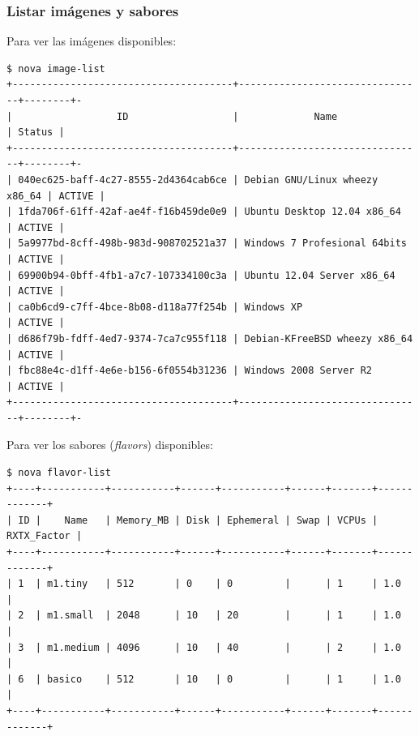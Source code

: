 \documentclass{beamer}
\begin{document}
\begin{frame}[fragile]
  \frametitle{Listar imágenes y sabores}
  Para ver las imágenes disponibles:
\begin{lstlisting}[style=consola]
$ nova image-list
+--------------------------------------+--------------------------------+--------+-
|                  ID                  |             Name               | Status | 
+--------------------------------------+--------------------------------+--------+-
| 040ec625-baff-4c27-8555-2d4364cab6ce | Debian GNU/Linux wheezy x86_64 | ACTIVE | 
| 1fda706f-61ff-42af-ae4f-f16b459de0e9 | Ubuntu Desktop 12.04 x86_64    | ACTIVE | 
| 5a9977bd-8cff-498b-983d-908702521a37 | Windows 7 Profesional 64bits   | ACTIVE | 
| 69900b94-0bff-4fb1-a7c7-107334100c3a | Ubuntu 12.04 Server x86_64     | ACTIVE | 
| ca0b6cd9-c7ff-4bce-8b08-d118a77f254b | Windows XP                     | ACTIVE | 
| d686f79b-fdff-4ed7-9374-7ca7c955f118 | Debian-KFreeBSD wheezy x86_64  | ACTIVE | 
| fbc88e4c-d1ff-4e6e-b156-6f0554b31236 | Windows 2008 Server R2         | ACTIVE | 
+--------------------------------------+--------------------------------+--------+-
\end{lstlisting}
Para ver los sabores (\textit{flavors}) disponibles:
\begin{lstlisting}[style=consola]
$ nova flavor-list
+----+-----------+-----------+------+-----------+------+-------+-------------+
| ID |    Name   | Memory_MB | Disk | Ephemeral | Swap | VCPUs | RXTX_Factor |
+----+-----------+-----------+------+-----------+------+-------+-------------+
| 1  | m1.tiny   | 512       | 0    | 0         |      | 1     | 1.0         |
| 2  | m1.small  | 2048      | 10   | 20        |      | 1     | 1.0         |
| 3  | m1.medium | 4096      | 10   | 40        |      | 2     | 1.0         |
| 6  | basico    | 512       | 10   | 0         |      | 1     | 1.0         |
+----+-----------+-----------+------+-----------+------+-------+-------------+
\end{lstlisting}
\end{frame}
\end{document}
